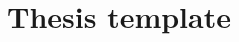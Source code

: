 \documentclass[
  muchcolor,     %
  BCOR=12mm,     %
  parskip=half,  %
  open=odd,      %
  cleardoublepage=plain,  %
  maincolour = maincolour,
  brandcolour = Wbrand,
]{warwickthesis}
\title{Thesis template}
\begin{document}
\frontmatter

\dominitoc%
\begin{spacing}{1}
\tableofcontents
\end{spacing}


\mainmatter



\clearpage

\appendix
\appendixpagenumbering


\clearpage

\backmatter
\backpagenumbering

\printbibliography[heading=none]
\end{document}
